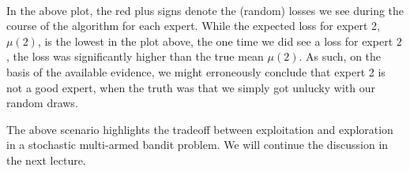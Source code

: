 \documentclass[11pt]{article}
\begin{document}
\paragraph{}
In the above plot, the red plus signs denote the (random) losses we see during the course of the algorithm for each expert. While the expected loss for expert 2, $\mu(2)$, is the lowest in the plot above, the one time we did see a loss for expert $2$, the loss was significantly higher than the true mean $\mu(2)$. As such, on the basis of the available evidence, we might erroneously conclude that expert 2 is not a good expert, when the truth was that we simply got unlucky with our random draws. 

The above scenario highlights the tradeoff between exploitation and exploration in a stochastic multi-armed bandit problem. We will continue the discussion in the next lecture. 




\end{document}
